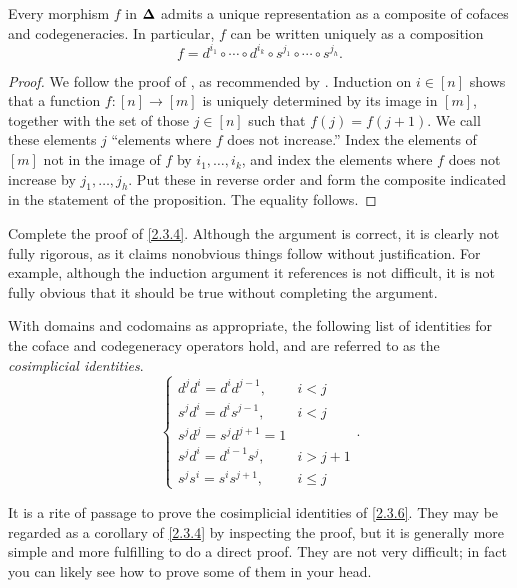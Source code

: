 \begin{proposition}\label{2.3.4}
    Every morphism $f$ in $\boldsymbol{\Delta}$ admits a unique representation as a composite of cofaces and codegeneracies. In particular, $f$ can be written uniquely as a composition
    \[
    f = d^{i_1}\circ \cdots\circ d^{i_k}\circ s^{j_1}\circ\cdots\circ s^{j_h}.
    \]
\end{proposition}
\begin{proof}
    We follow the proof of \cite[VII.5]{ml}, as recommended by \cite{gj}. Induction on $i\in [n]$ shows that a function $f : [n]\to [m]$ is uniquely determined by its image in $[m]$, together with the set of those $j\in [n]$ such that $f(j)=f(j+1)$. We call these elements $j$ ``elements where $f$ does not increase.'' Index the elements of $[m]$ not in the image of $f$ by $i_1,\ldots, i_k$, and index the elements where $f$ does not increase by $j_1,\ldots,j_h$. Put these in reverse order and form the composite indicated in the statement of the proposition. The equality follows.
\end{proof}

\begin{exercise}\label{2.3.5}
    Complete the proof of \cref{2.3.4}. Although the argument is correct, it is clearly not fully rigorous, as it claims nonobvious things follow without justification. For example, although the induction argument it references is not difficult, it is not fully obvious that it should be true without completing the argument.
\end{exercise}

\begin{proposition}\label{2.3.6}
    With domains and codomains as appropriate, the following list of identities for the coface and codegeneracy operators hold, and are referred to as the \emph{cosimplicial identities}.
    \[
    \begin{cases}
        d^jd^i = d^id^{j-1},& i<j\\
        s^jd^i=d^is^{j-1},&i<j\\
        s^jd^j=s^jd^{j+1}=1&\\
        s^jd^i=d^{i-1}s^j,&i>j+1\\
        s^js^i=s^is^{j+1},&i\leq j
    \end{cases}.
    \]
\end{proposition}

\begin{exercise}\label{2.3.7}
    It is a rite of passage to prove the cosimplicial identities of \cref{2.3.6}. They may be regarded as a corollary of \cref{2.3.4} by inspecting the proof, but it is generally more simple and more fulfilling to do a direct proof. They are not very difficult; in fact you can likely see how to prove some of them in your head.
\end{exercise}

